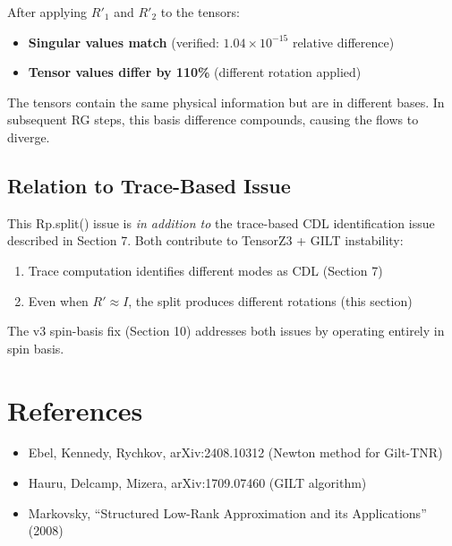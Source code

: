 \documentclass{article}
\begin{document}
After applying $R'_1$ and $R'_2$ to the tensors:
\begin{itemize}
    \item \textbf{Singular values match} (verified: $1.04 \times 10^{-15}$ relative difference)
    \item \textbf{Tensor values differ by 110\%} (different rotation applied)
\end{itemize}

The tensors contain the same physical information but are in different bases. In subsequent RG steps, this basis difference compounds, causing the flows to diverge.

\subsection{Relation to Trace-Based Issue}

This Rp.split() issue is \textit{in addition to} the trace-based CDL identification issue described in Section 7. Both contribute to TensorZ3 + GILT instability:
\begin{enumerate}
    \item Trace computation identifies different modes as CDL (Section 7)
    \item Even when $R' \approx I$, the split produces different rotations (this section)
\end{enumerate}

The v3 spin-basis fix (Section 10) addresses both issues by operating entirely in spin basis.

\section{References}

\begin{itemize}
    \item Ebel, Kennedy, Rychkov, arXiv:2408.10312 (Newton method for Gilt-TNR)
    \item Hauru, Delcamp, Mizera, arXiv:1709.07460 (GILT algorithm)
    \item Markovsky, ``Structured Low-Rank Approximation and its Applications'' (2008)
\end{itemize}
\end{document}
